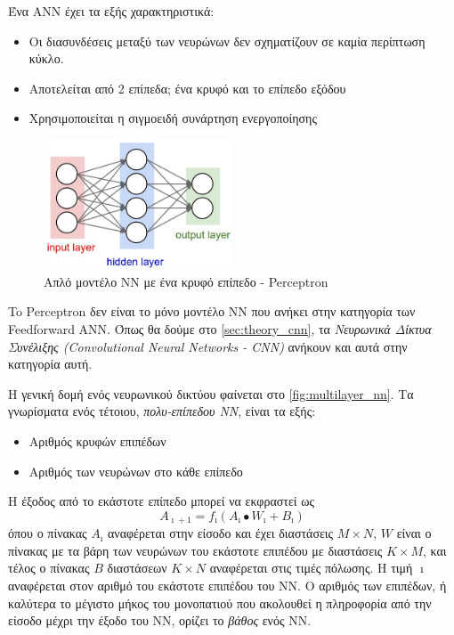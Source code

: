Ένα ΑΝΝ έχει τα εξής χαρακτηριστικά:
\begin{itemize}
  \item{Οι διασυνδέσεις μεταξύ των νευρώνων δεν σχηματίζουν σε καμία περίπτωση κύκλο.}
  \item{Αποτελείται από 2 επίπεδα; ένα κρυφό και το επίπεδο εξόδου}
  \item{Χρησιμοποιείται η σιγμοειδή συνάρτηση ενεργοποίησης}
\end{itemize}

\begin{figure}[!ht]
  \centering
  \includegraphics[width=0.5\textwidth]{./images/chapter3/simple_nn.jpg}
  \caption[Απλό μοντέλο NN με ένα κρυφό επίπεδο - Perceptron]{Απλό μοντέλο NN με ένα κρυφό επίπεδο - Perceptron}
  \label{fig:simple_nn}
\end{figure}

To Perceptron δεν είναι το μόνο
μοντέλο ΝΝ που ανήκει στην κατηγορία των Feedforward ANN. Όπως θα δούμε στο
\autoref{sec:theory_cnn}, τα \emph{Νευρωνικά Δίκτυα Συνέλιξης
(Convolutional Neural Networks - CNN)} ανήκουν και αυτά στην κατηγορία αυτή.

Η γενική δομή ενός νευρωνικού δικτύου φαίνεται στο \autoref{fig:multilayer_nn}.
Τα γνωρίσματα ενός τέτοιου, \emph{πολυ-επίπεδου ΝΝ}, είναι τα εξής:
\begin{itemize}
  \item{Αριθμός κρυφών επιπέδων}
  \item{Αριθμός των νευρώνων στο κάθε επίπεδο}
\end{itemize}
Η έξοδος από το εκάστοτε επίπεδο μπορεί να εκφραστεί ως
\[
  A_{\imath+1} = f_{\imath}(A_{\imath} \bullet W_{\imath} + B_{\imath})
\]
όπου ο πίνακας $A_{\imath}$ αναφέρεται στην είσοδο και έχει διαστάσεις $M \times N$,
$W$ είναι ο πίνακας με τα βάρη των νευρώνων του εκάστοτε επιπέδου με διαστάσεις
$K \times M$, και τέλος ο πίνακας $B$ διαστάσεων $K \times N$ αναφέρεται στις
τιμές πόλωσης.
Η τιμή $\imath$ αναφέρεται στον αριθμό του εκάστοτε επιπέδου του ΝΝ.
Ο αριθμός των επιπέδων, ή καλύτερα το μέγιστο μήκος του μονοπατιού που ακολουθεί
η πληροφορία από την είσοδο μέχρι την έξοδο του ΝΝ, ορίζει το \emph{βάθος} ενός ΝΝ.

